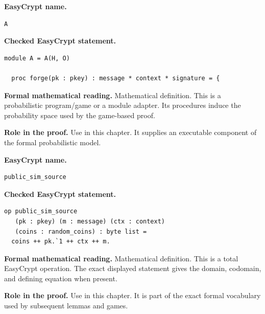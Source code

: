 \begin{formaldefinition}
\noindent\textbf{EasyCrypt name.}
\begin{lstlisting}[language=EasyCrypt,basicstyle=\ttfamily\scriptsize]
A
\end{lstlisting}
\noindent\textbf{Checked EasyCrypt statement.}
\begin{lstlisting}[language=EasyCrypt,basicstyle=\ttfamily\scriptsize]
module A = A(H, O)

  proc forge(pk : pkey) : message * context * signature = {
\end{lstlisting}
\noindent\textbf{Formal mathematical reading.}
Mathematical definition. This is a probabilistic program/game or a module adapter.  Its procedures induce the probability space used by the game-based proof.

\noindent\textbf{Role in the proof.}
Use in this chapter. It supplies an executable component of the formal probabilistic model.

\end{formaldefinition}

\begin{formaldefinition}
\noindent\textbf{EasyCrypt name.}
\begin{lstlisting}[language=EasyCrypt,basicstyle=\ttfamily\scriptsize]
public_sim_source
\end{lstlisting}
\noindent\textbf{Checked EasyCrypt statement.}
\begin{lstlisting}[language=EasyCrypt,basicstyle=\ttfamily\scriptsize]
op public_sim_source
   (pk : pkey) (m : message) (ctx : context)
   (coins : random_coins) : byte list =
  coins ++ pk.`1 ++ ctx ++ m.
\end{lstlisting}
\noindent\textbf{Formal mathematical reading.}
Mathematical definition. This is a total EasyCrypt operation.  The exact displayed statement gives the domain, codomain, and defining equation when present.

\noindent\textbf{Role in the proof.}
Use in this chapter. It is part of the exact formal vocabulary used by subsequent lemmas and games.

\end{formaldefinition}

